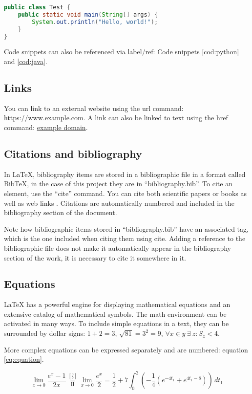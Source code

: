 \begin{lstlisting}[language=Java, caption={Java coode}, label={cod:java}, captionpos=b]
public class Test {
    public static void main(String[] args) {
        System.out.println("Hello, world!");
    }
}
\end{lstlisting}

Code snippets can also be referenced via label/ref: Code snippets \ref{cod:python} and \ref{cod:java}.

\subsection{Links}
You can link to an external website using the url command: \url{https://www.example.com}. A link can also be linked to text using the href command: \href{https://www.example.com}{example domain}.

\subsection{Citations and bibliography}
In LaTeX, bibliography items are stored in a bibliographic file in a format called BibTeX, in the case of this project they are in ``bibliography.bib''. To cite an element, use the ``cite'' command. You can cite both scientific papers \cite{berners1994} or books \cite{swales1994} as well as web links \cite{webETSII}. Citations are automatically numbered and included in the bibliography section of the document.

Note how bibliographic items stored in ``bibliography.bib'' have an associated tag, which is the one included when citing them using cite. Adding a reference to the bibliographic file does not make it automatically appear in the bibliography section of the work, it is necessary to cite it somewhere in it.

\subsection{Equations}
LaTeX has a powerful engine for displaying mathematical equations and an extensive catalog of mathematical symbols. The math environment can be activated in many ways. To include simple equations in a text, they can be surrounded by dollar signs: $1 + 2 = 3$, $\sqrt{81} = 3^2 = 9$, $\forall x \in y~\exists~z : S_z < $4.

More complex equations can be expressed separately and are numbered: equation \ref{eq:equation}.

\begin{equation}\label{eq:equation}
\lim_{x\to 0}{\frac{e^x-1}{2x}}
 \overset{\left[\frac{0}{0}\right]}{\underset{\mathrm{H}}{=}}
 \lim_{x\to 0}{\frac{e^x}{2}}={\frac{1}{2}}
 +7 \int_0^2
  \left(
    -\frac{1}{4}\left(e^{-4t_1}+e^{4t_1-8}\right)
  \right)\,dt_1
\end{equation}

